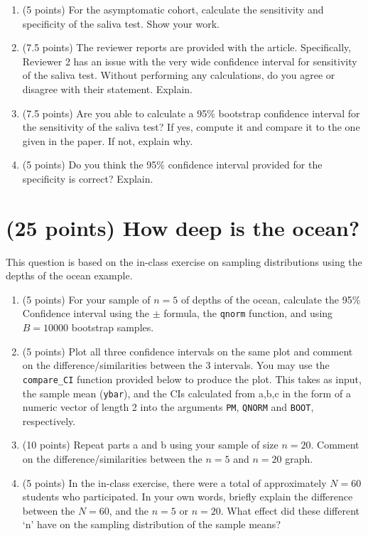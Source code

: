 \documentclass[letterpaper,12pt,twoside,]{pinp}
\providecommand{\tightlist}{%
  \setlength{\itemsep}{0pt}\setlength{\parskip}{0pt}}
\begin{document}
\begin{enumerate}
\def\labelenumi{\alph{enumi}.}
\tightlist
\item
  (5 points) For the asymptomatic cohort, calculate the sensitivity and
  specificity of the saliva test. Show your work.\\
\item
  (7.5 points) The reviewer reports are provided with the article.
  Specifically, Reviewer 2 has an issue with the very wide confidence
  interval for sensitivity of the saliva test. Without performing any
  calculations, do you agree or disagree with their statement.
  Explain.\\
\item
  (7.5 points) Are you able to calculate a 95\% bootstrap confidence
  interval for the sensitivity of the saliva test? If yes, compute it
  and compare it to the one given in the paper. If not, explain why.\\
\item
  (5 points) Do you think the 95\% confidence interval provided for the
  specificity is correct? Explain.
\end{enumerate}

\hypertarget{points-how-deep-is-the-ocean}{%
\section{(25 points) How deep is the
ocean?}\label{points-how-deep-is-the-ocean}}

This question is based on the in-class exercise on sampling
distributions using the depths of the ocean example.

\begin{enumerate}
\def\labelenumi{\alph{enumi}.}
\tightlist
\item
  (5 points) For your sample of \(n=5\) of depths of the ocean,
  calculate the 95\% Confidence interval using the \(\pm\) formula, the
  \texttt{qnorm} function, and using \(B=10000\) bootstrap samples.\\
\item
  (5 points) Plot all three confidence intervals on the same plot and
  comment on the difference/similarities between the 3 intervals. You
  may use the \texttt{compare\_CI} function provided below to produce
  the plot. This takes as input, the sample mean (\texttt{ybar}), and
  the CIs calculated from a,b,c in the form of a numeric vector of
  length 2 into the arguments \texttt{PM}, \texttt{QNORM} and
  \texttt{BOOT}, respectively.\\
\item
  (10 points) Repeat parts a and b using your sample of size \(n=20\).
  Comment on the difference/similarities between the \(n=5\) and
  \(n=20\) graph.\\
\item
  (5 points) In the in-class exercise, there were a total of
  approximately \(N=60\) students who participated. In your own words,
  briefly explain the difference between the \(N=60\), and the \(n=5\)
  or \(n=20\). What effect did these different `n' have on the sampling
  distribution of the sample means?
\end{enumerate}
\end{document}
